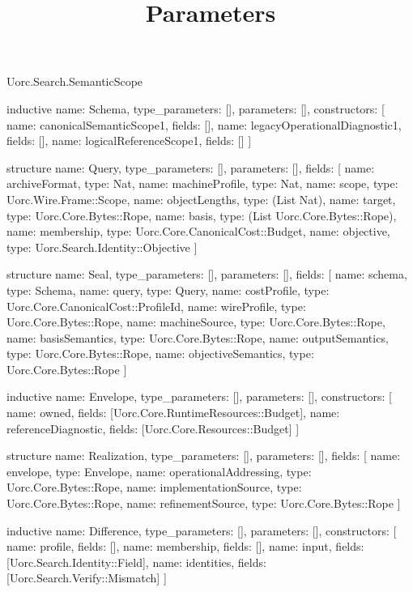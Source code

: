 \begin{lexlean}{Uorc.Search.SemanticScope}
\title{Parameters}
\begin{semanticmodule}
inductive{
  name: Schema,
  type_parameters: [],
  parameters: [],
  constructors: [
    {name: canonicalSemanticScope1, fields: []},
    {name: legacyOperationalDiagnostic1, fields: []},
    {name: logicalReferenceScope1, fields: []}
  ]
}

structure{
  name: Query,
  type_parameters: [],
  parameters: [],
  fields: [
    {name: archiveFormat, type: Nat},
    {name: machineProfile, type: Nat},
    {name: scope, type: Uorc.Wire.Frame::Scope},
    {name: objectLengths, type: (List Nat)},
    {name: target, type: Uorc.Core.Bytes::Rope},
    {name: basis, type: (List Uorc.Core.Bytes::Rope)},
    {name: membership, type: Uorc.Core.CanonicalCost::Budget},
    {name: objective, type: Uorc.Search.Identity::Objective}
  ]
}

structure{
  name: Seal,
  type_parameters: [],
  parameters: [],
  fields: [
    {name: schema, type: Schema},
    {name: query, type: Query},
    {name: costProfile, type: Uorc.Core.CanonicalCost::ProfileId},
    {name: wireProfile, type: Uorc.Core.Bytes::Rope},
    {name: machineSource, type: Uorc.Core.Bytes::Rope},
    {name: basisSemantics, type: Uorc.Core.Bytes::Rope},
    {name: outputSemantics, type: Uorc.Core.Bytes::Rope},
    {name: objectiveSemantics, type: Uorc.Core.Bytes::Rope}
  ]
}

inductive{
  name: Envelope,
  type_parameters: [],
  parameters: [],
  constructors: [
    {name: owned, fields: [Uorc.Core.RuntimeResources::Budget]},
    {name: referenceDiagnostic, fields: [Uorc.Core.Resources::Budget]}
  ]
}

structure{
  name: Realization,
  type_parameters: [],
  parameters: [],
  fields: [
    {name: envelope, type: Envelope},
    {name: operationalAddressing, type: Uorc.Core.Bytes::Rope},
    {name: implementationSource, type: Uorc.Core.Bytes::Rope},
    {name: refinementSource, type: Uorc.Core.Bytes::Rope}
  ]
}

inductive{
  name: Difference,
  type_parameters: [],
  parameters: [],
  constructors: [
    {name: profile, fields: []},
    {name: membership, fields: []},
    {name: input, fields: [Uorc.Search.Identity::Field]},
    {name: identities, fields: [Uorc.Search.Verify::Mismatch]}
  ]
}


\end{semanticmodule}
\end{lexlean}
